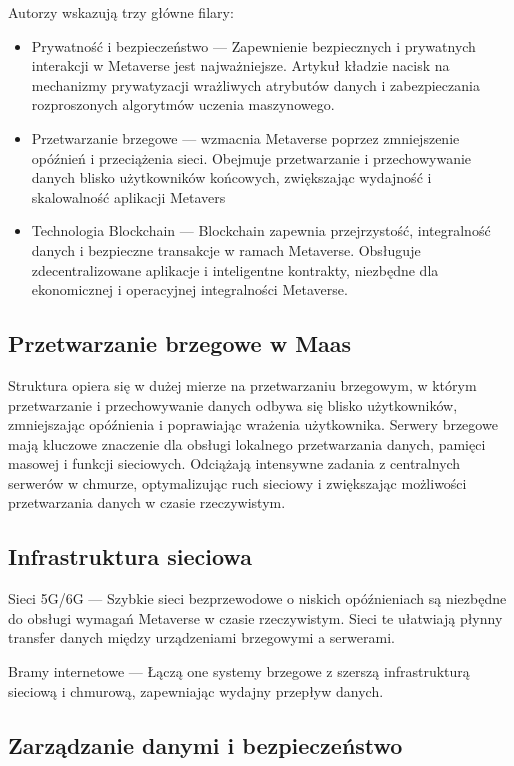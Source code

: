 Autorzy wskazują trzy główne filary:
\begin{itemize}
    \item Prywatność i bezpieczeństwo --- Zapewnienie bezpiecznych i prywatnych interakcji w Metaverse jest najważniejsze. Artykuł kładzie nacisk na mechanizmy prywatyzacji wrażliwych atrybutów danych i zabezpieczania rozproszonych algorytmów uczenia maszynowego.
    \item Przetwarzanie brzegowe --- wzmacnia Metaverse poprzez zmniejszenie opóźnień i przeciążenia sieci. Obejmuje przetwarzanie i przechowywanie danych blisko użytkowników końcowych, zwiększając wydajność i skalowalność aplikacji Metavers
    \item Technologia Blockchain --- Blockchain zapewnia przejrzystość, integralność danych i bezpieczne transakcje w ramach Metaverse. Obsługuje zdecentralizowane aplikacje i inteligentne kontrakty, niezbędne dla ekonomicznej i operacyjnej integralności Metaverse.
\end{itemize}

\subsection{Przetwarzanie brzegowe w Maas}

Struktura  opiera się w dużej mierze na przetwarzaniu brzegowym, w którym przetwarzanie i przechowywanie danych odbywa się blisko użytkowników, zmniejszając opóźnienia i poprawiając wrażenia użytkownika. Serwery brzegowe mają kluczowe znaczenie dla obsługi lokalnego przetwarzania danych, pamięci masowej i funkcji sieciowych. Odciążają intensywne zadania z centralnych serwerów w chmurze, optymalizując ruch sieciowy i zwiększając możliwości przetwarzania danych w czasie rzeczywistym.

\subsection{Infrastruktura sieciowa}

Sieci 5G/6G --- Szybkie sieci bezprzewodowe o niskich opóźnieniach są niezbędne do obsługi wymagań Metaverse w czasie rzeczywistym. Sieci te ułatwiają płynny transfer danych między urządzeniami brzegowymi a serwerami. 

Bramy internetowe --- Łączą one systemy brzegowe z szerszą infrastrukturą sieciową i chmurową, zapewniając wydajny przepływ danych.

\subsection{Zarządzanie danymi i bezpieczeństwo}

